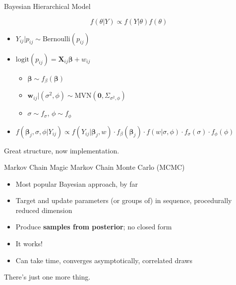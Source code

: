 \documentclass{beamer}
\begin{document}
\begin{frame}{Bayesian Hierarchical Model}{} %

$$f(\theta|Y) \propto f(Y|\theta)f(\theta)$$

\begin{itemize}
\addtolength{\itemsep}{0.5\baselineskip}
\item $Y_{ij}|p_{ij} \sim \text{Bernoulli}(p_{ij})$
\item $\text{logit}(p_{ij}) = \pmb{X}_{ij} \pmb{\beta} + w_{ij}$
  \begin{itemize}
  \addtolength{\itemsep}{0.5\baselineskip}
  \item $\pmb{\beta} \sim f_{\beta}(\pmb{\beta})$
  \item $\pmb{w}_{ij}|(\sigma^{2}, \phi) \sim \text{MVN}(\pmb{0}, \Sigma_{\sigma^{2}, \phi})$
  \item $\sigma \sim f_{\sigma}$, $\phi \sim f_{\phi}$
  \end{itemize}        
\item $f(\pmb{\beta}_{j}, \sigma, \phi|Y_{ij}) \propto  f(Y_{ij}|\pmb{\beta}_{j}, w) \cdot f_{\beta}(\pmb{\beta}_{j}) \cdot f(w|\sigma, \phi) \cdot f_{\sigma}(\sigma) \cdot f_{\phi}(\phi)$
\end{itemize}

Great structure, now implementation.
\end{frame}

\begin{frame}{Markov Chain Magic}
Markov Chain Monte Carlo (MCMC) \\

        \begin{itemize}
        \addtolength{\itemsep}{0.5\baselineskip}
        \item Most popular Bayesian approach, by far 
        \item Target and update parameters (or groups of) in sequence, procedurally reduced dimension
        \item Produce {\bf samples from posterior}; no closed form
        \item It works!
        \item Can take time, converges asymptotically, correlated draws
        \end{itemize}
        
There's just one more thing.
\end{frame}
\end{document}
